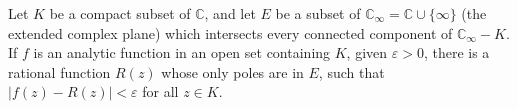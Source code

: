 \documentclass[12pt]{article}
\begin{document}
Let $K$ be a compact subset of $\mathbb{C}$, and let $E$ be a subset of 
$\mathbb{C}_\infty=\mathbb{C}\cup\{\infty\}$ (the extended complex plane) which intersects every connected component of $\mathbb{C}_\infty-K$. If $f$ is an analytic function in an open set containing $K$, given $\varepsilon>0$, there is a rational function $R(z)$ whose only poles are in $E$, such that 
$|f(z)-R(z)|<\varepsilon$ for all $z\in K$.
\end{document}
